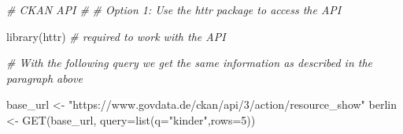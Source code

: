 \documentclass[
]{book}
\newenvironment{Shaded}{\begin{snugshade}}{\end{snugshade}}
\newcommand{\AttributeTok}[1]{\textcolor[rgb]{0.77,0.63,0.00}{#1}}
\newcommand{\CommentTok}[1]{\textcolor[rgb]{0.56,0.35,0.01}{\textit{#1}}}
\newcommand{\DecValTok}[1]{\textcolor[rgb]{0.00,0.00,0.81}{#1}}
\newcommand{\FunctionTok}[1]{\textcolor[rgb]{0.00,0.00,0.00}{#1}}
\newcommand{\NormalTok}[1]{#1}
\newcommand{\OtherTok}[1]{\textcolor[rgb]{0.56,0.35,0.01}{#1}}
\newcommand{\StringTok}[1]{\textcolor[rgb]{0.31,0.60,0.02}{#1}}
\begin{document}
\begin{Shaded}
\begin{Highlighting}[]
\CommentTok{\# CKAN API \#}
\CommentTok{\# Option 1: Use the httr package to access the API}

\FunctionTok{library}\NormalTok{(httr) }\CommentTok{\# required to work with the API}

\CommentTok{\# With the following query we get the same information as described in the paragraph above}

\NormalTok{base\_url }\OtherTok{\textless{}{-}} \StringTok{"https://www.govdata.de/ckan/api/3/action/resource\_show"}
\NormalTok{berlin }\OtherTok{\textless{}{-}} \FunctionTok{GET}\NormalTok{(base\_url, }\AttributeTok{query=}\FunctionTok{list}\NormalTok{(}\AttributeTok{q=}\StringTok{"kinder"}\NormalTok{,}\AttributeTok{rows=}\DecValTok{5}\NormalTok{))}
\end{Highlighting}
\end{Shaded}
\end{document}
